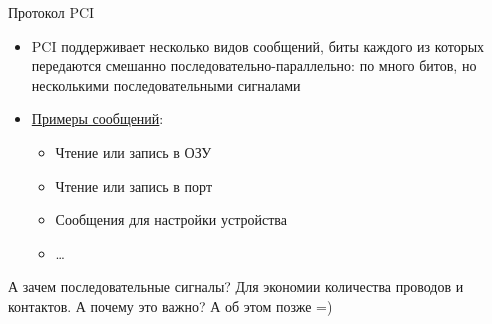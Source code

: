 \documentclass[xetex,aspectratio=43]{beamer}
\begin{document}
\begin{frame}{Протокол PCI}
    \begin{itemize}
        \item PCI поддерживает несколько видов сообщений, биты каждого из которых передаются смешанно последовательно-параллельно: по много битов, но несколькими последовательными сигналами
        \item \href{https://en.wikipedia.org/wiki/Peripheral_Component_Interconnect\#PCI_command_codes}{Примеры сообщений}:
        \begin{itemize}
            \item Чтение или запись в ОЗУ
            \item Чтение или запись в порт
            \item Сообщения для настройки устройства
            \item \ldots
        \end{itemize}
    \end{itemize}
    \pause
    \alert{А зачем последовательные сигналы? Для экономии количества проводов и контактов.} А почему это важно? А об этом позже =)
\end{frame}
\end{document}
